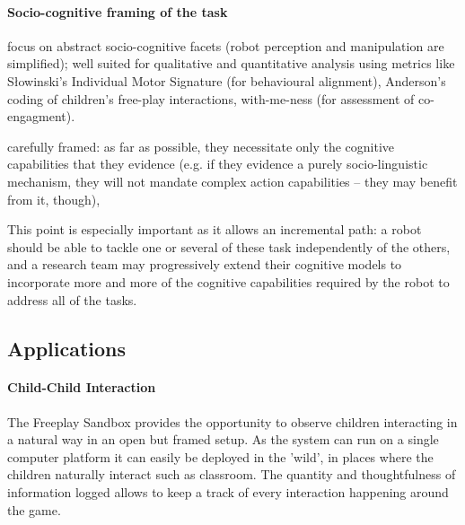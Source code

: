 \documentclass[sigconf]{acmart}
\begin{document}
%

\paragraph{Socio-cognitive framing of the task}

focus on abstract socio-cognitive facets (robot
perception and manipulation are simplified); well suited for qualitative and
quantitative analysis using metrics like Słowinski’s Individual Motor Signature
(for behavioural alignment), Anderson's~\cite{anderson2004social} coding of children’s free-play
interactions, with-me-ness (for assessment of co-engagment).

carefully framed: as far as possible, they necessitate only the cognitive
capabilities that they evidence (e.g. if they evidence a purely socio-linguistic
mechanism, they will not mandate complex action capabilities – they may benefit
from it, though),

This point is especially important as it allows an incremental path: a robot
should be able to tackle one or several of these task independently of the
others, and a research team may progressively extend their cognitive models to
incorporate more and more of the cognitive capabilities required by the robot to
address all of the tasks.

\subsection{Applications}
\label{sec:applications}

\paragraph{Child-Child Interaction}

The Freeplay Sandbox provides the opportunity to observe children interacting in a natural way in an open but framed setup. As the system can run on a single computer platform it can easily be deployed in the 'wild', in places where the children naturally interact such as classroom. The quantity and thoughtfulness of information logged allows to keep a track of every interaction happening around the game. 
\end{document}
